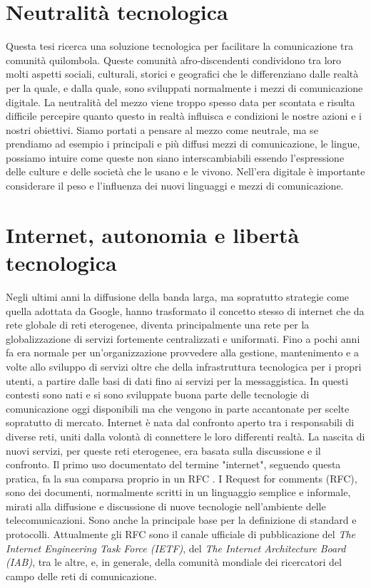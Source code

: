 \section{Neutralità tecnologica}
Questa tesi ricerca una soluzione tecnologica per facilitare la
comunicazione tra comunità quilombola. Queste comunità
afro-discendenti condividono tra loro molti aspetti sociali,
culturali, storici e geografici che le differenziano dalle realtà per
la quale, e dalla quale, sono sviluppati normalmente i mezzi di
comunicazione digitale. La neutralità del mezzo viene troppo spesso
data per scontata e risulta difficile percepire quanto questo in
realtà influisca e condizioni le nostre azioni e i nostri
obiettivi. Siamo portati a pensare al mezzo come neutrale, ma se
prendiamo ad esempio i principali e più diffusi mezzi di
comunicazione, le lingue, possiamo intuire come queste non siano
interscambiabili essendo l'espressione delle culture e delle società
che le usano e le vivono. Nell'era digitale è importante considerare
il peso e l'influenza dei nuovi linguaggi e mezzi di comunicazione.

\section{Internet, autonomia e libertà tecnologica}
Negli ultimi anni la diffusione della banda larga, ma sopratutto
strategie come quella adottata da Google, hanno trasformato il
concetto stesso di internet che da rete globale di reti eterogenee,
diventa principalmente una rete per la globalizzazione di servizi
fortemente centralizzati e uniformati. Fino a pochi anni fa era
normale per un'organizzazione provvedere alla gestione, mantenimento e
a volte allo sviluppo di servizi oltre che della infrastruttura
tecnologica per i propri utenti, a partire dalle basi di dati fino ai
servizi per la messaggistica. In questi contesti sono nati e si sono
sviluppate buona parte delle tecnologie di comunicazione oggi
disponibili ma che vengono in parte accantonate per scelte sopratutto
di mercato. Internet è nata dal confronto aperto tra i responsabili di
diverse reti, uniti dalla volontà di connettere le loro differenti
realtà. La nascita di nuovi servizi, per queste reti eterogenee, era
basata sulla discussione e il confronto. Il primo uso documentato del
termine "internet", seguendo questa pratica, fa la sua comparsa
proprio in un RFC \citep{RFC675}. I Request for comments (RFC), sono
dei documenti, normalmente scritti in un linguaggio semplice e
informale, mirati alla diffusione e discussione di nuove tecnologie
nell'ambiente delle telecomunicazioni. Sono anche la principale base
per la definizione di standard e protocolli. Attualmente gli RFC sono
il canale ufficiale di pubblicazione del \emph{The Internet
  Engineering Task Force (IETF)}, del \emph{The Internet Architecture
  Board (IAB)}, tra le altre, e, in generale, della comunità mondiale
dei ricercatori del campo delle reti di comunicazione.


